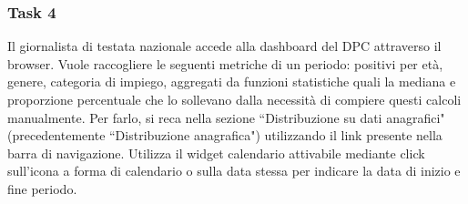 \subsubsection{Task 4}
\label{sss:cw-task-4}

Il giornalista di testata nazionale accede alla dashboard del DPC attraverso il browser.
Vuole raccogliere le seguenti metriche di un periodo: positivi per età, genere, categoria di impiego, aggregati da funzioni statistiche quali la mediana e proporzione percentuale che lo sollevano dalla necessità di compiere questi calcoli manualmente.
Per farlo, si reca nella sezione ``Distribuzione su dati anagrafici" (precedentemente ``Distribuzione anagrafica") utilizzando il link presente nella barra di navigazione.
Utilizza il widget calendario attivabile mediante click sull'icona a forma di calendario o sulla data stessa per indicare la data di inizio e fine periodo.